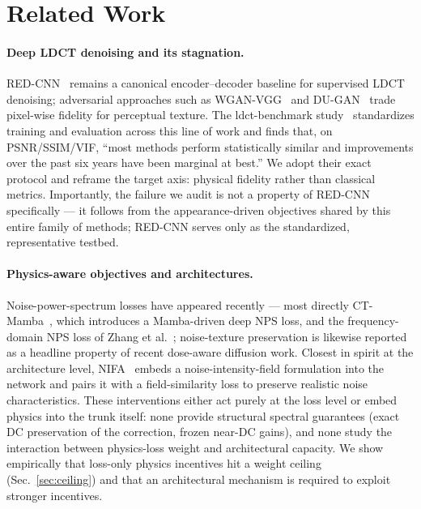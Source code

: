 \section{Related Work}
\label{sec:related}

\paragraph{Deep LDCT denoising and its stagnation.}
RED-CNN~\cite{chen2017} remains a canonical encoder--decoder baseline for supervised LDCT denoising; adversarial approaches such as WGAN-VGG~\cite{yang2018} and DU-GAN~\cite{huang2022} trade pixel-wise fidelity for perceptual texture. The ldct-benchmark study~\cite{eulig2024} standardizes training and evaluation across this line of work and finds that, on PSNR/SSIM/VIF, ``most methods perform statistically similar and improvements over the past six years have been marginal at best.'' We adopt their exact protocol and reframe the target axis: physical fidelity rather than classical metrics. Importantly, the failure we audit is not a property of RED-CNN specifically --- it follows from the appearance-driven objectives shared by this entire family of methods; RED-CNN serves only as the standardized, representative testbed.

\paragraph{Physics-aware objectives and architectures.}
Noise-power-spectrum losses have appeared recently --- most directly CT-Mamba~\cite{li2025}, which introduces a Mamba-driven deep NPS loss, and the frequency-domain NPS loss of Zhang et al.~\cite{zhang2025}; noise-texture preservation is likewise reported as a headline property of recent dose-aware diffusion work. Closest in spirit at the architecture level, NIFA~\cite{zhao2026} embeds a noise-intensity-field formulation into the network and pairs it with a field-similarity loss to preserve realistic noise characteristics. These interventions either act purely at the loss level or embed physics into the trunk itself: none provide structural spectral guarantees (exact DC preservation of the correction, frozen near-DC gains), and none study the interaction between physics-loss weight and architectural capacity. We show empirically that loss-only physics incentives hit a weight ceiling (Sec.~\ref{sec:ceiling}) and that an architectural mechanism is required to exploit stronger incentives.


